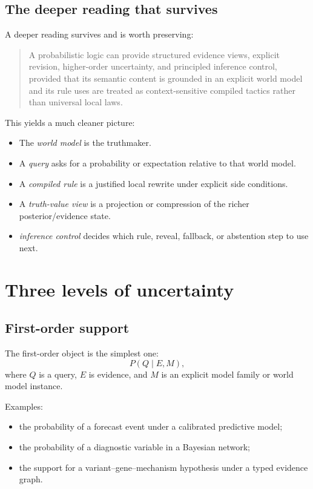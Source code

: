 \documentclass[11pt]{article}
\begin{document}
\subsection{The deeper reading that survives}
A deeper reading survives and is worth preserving:
\begin{quote}
A probabilistic logic can provide structured evidence views, explicit revision, higher-order uncertainty, and principled inference control, provided that its semantic content is grounded in an explicit world model and its rule uses are treated as context-sensitive compiled tactics rather than universal local laws.
\end{quote}

This yields a much cleaner picture:
\begin{itemize}
    \item The \emph{world model} is the truthmaker.
    \item A \emph{query} asks for a probability or expectation relative to that world model.
    \item A \emph{compiled rule} is a justified local rewrite under explicit side conditions.
    \item A \emph{truth-value view} is a projection or compression of the richer posterior/evidence state.
    \item \emph{inference control} decides which rule, reveal, fallback, or abstention step to use next.
\end{itemize}

\section{Three levels of uncertainty}
\subsection{First-order support}
The first-order object is the simplest one:
\begin{equation}
P(Q \mid E, M),
\end{equation}
where $Q$ is a query, $E$ is evidence, and $M$ is an explicit model family or world model instance.

Examples:
\begin{itemize}
    \item the probability of a forecast event under a calibrated predictive model;
    \item the probability of a diagnostic variable in a Bayesian network;
    \item the support for a variant--gene--mechanism hypothesis under a typed evidence graph.
\end{itemize}
\end{document}
